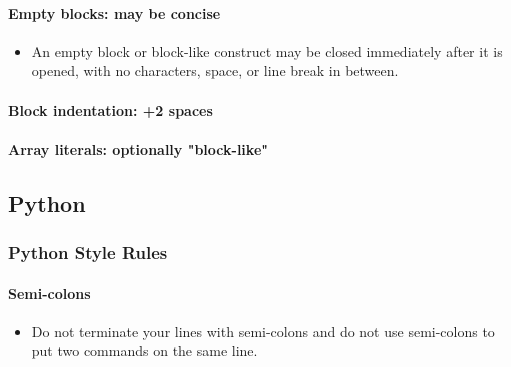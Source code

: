 \documentclass[a4paper, 11pt]{article}
\begin{document}
\paragraph{Empty blocks: may be concise}
\begin{itemize}
\item An empty block or block-like construct may be closed immediately after it is opened, with no characters, space, or line break in between.
\end{itemize}

\paragraph{Block indentation: +2 spaces}

\paragraph{Array literals: optionally "block-like"}

\newpage
\subsection{Python}
\subsubsection{Python Style Rules}
\paragraph{Semi-colons}
\begin{itemize}
\item  Do not terminate your lines with semi-colons and do not use semi-colons to put two commands on the same line.
\end{itemize}
\end{document}
